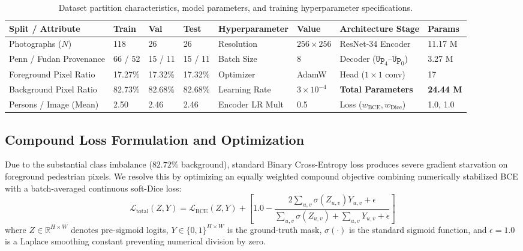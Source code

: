 \documentclass[10pt,a4paper]{article}
\begin{document}
\begin{table}[htbp]
\centering
\scriptsize
\setlength{\tabcolsep}{3.5pt}
\caption{Dataset partition characteristics, model parameters, and training hyperparameter specifications.}
\label{tab:dataset_and_params}
\begin{tabularx}{\linewidth}{l Y Y Y | l Y l Y}
\toprule
\textbf{Split / Attribute} & \textbf{Train} & \textbf{Val} & \textbf{Test} & \textbf{Hyperparameter} & \textbf{Value} & \textbf{Architecture Stage} & \textbf{Params} \\
\midrule
Photographs ($N$) & 118 & 26 & 26 & Resolution & $256 \times 256$ & ResNet-34 Encoder & 11.17 M \\
Penn / Fudan Provenance & 66 / 52 & 15 / 11 & 15 / 11 & Batch Size & 8 & Decoder ($\mathtt{Up}_4$--$\mathtt{Up}_0$) & 3.27 M \\
Foreground Pixel Ratio & 17.27\% & 17.32\% & 17.32\% & Optimizer & AdamW & Head ($1\times 1$ conv) & 17 \\
Background Pixel Ratio & 82.73\% & 82.68\% & 82.68\% & Learning Rate & $3 \times 10^{-4}$ & \textbf{Total Parameters} & \textbf{24.44 M} \\
Persons / Image (Mean) & 2.50 & 2.46 & 2.46 & Encoder LR Mult & 0.5 & Loss ($w_{\text{BCE}}, w_{\text{Dice}}$) & 1.0, 1.0 \\
\bottomrule
\end{tabularx}
\end{table}

\subsection{Compound Loss Formulation and Optimization}
Due to the substantial class imbalance ($82.72\%$ background), standard Binary Cross-Entropy loss produces severe gradient starvation on foreground pedestrian pixels. We resolve this by optimizing an equally weighted compound objective combining numerically stabilized BCE with a batch-averaged continuous soft-Dice loss:
\begin{equation}
    \mathcal{L}_{\text{total}}(Z, Y) = \mathcal{L}_{\text{BCE}}(Z, Y) + \left[ 1.0 - \frac{2 \sum_{u,v} \sigma(Z_{u,v}) Y_{u,v} + \epsilon}{\sum_{u,v} \sigma(Z_{u,v}) + \sum_{u,v} Y_{u,v} + \epsilon} \right]
    \label{eq:compound_loss}
\end{equation}
where $Z \in \mathbb{R}^{H \times W}$ denotes pre-sigmoid logits, $Y \in \{0, 1\}^{H \times W}$ is the ground-truth mask, $\sigma(\cdot)$ is the standard sigmoid function, and $\epsilon = 1.0$ is a Laplace smoothing constant preventing numerical division by zero. 
\end{document}
